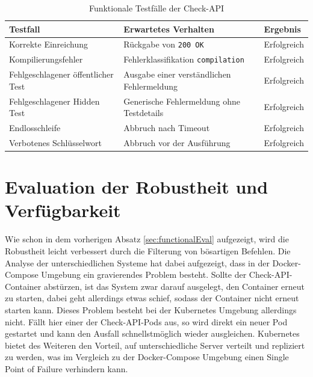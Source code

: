   \begin{table}[htbp]
	\centering
	\caption{Funktionale Testfälle der Check-API}
	\label{tab:functional-evaluation}
	\begin{tabular}{p{4cm} p{5cm} p{4cm}}
		\textbf{Testfall} & \textbf{Erwartetes Verhalten} & \textbf{Ergebnis} \\
		\hline
		Korrekte Einreichung & Rückgabe von \texttt{200 OK} & Erfolgreich \\
		Kompilierungsfehler & Fehlerklassifikation \texttt{compilation} & Erfolgreich \\
		Fehlgeschlagener öffentlicher Test & Ausgabe einer verständlichen Fehlermeldung & Erfolgreich \\
		Fehlgeschlagener Hidden Test & Generische Fehlermeldung ohne Testdetails & Erfolgreich \\
		Endlosschleife & Abbruch nach Timeout & Erfolgreich \\
		Verbotenes Schlüsselwort & Abbruch vor der Ausführung & Erfolgreich \\
	\end{tabular}
\end{table}


\section{Evaluation der Robustheit und Verfügbarkeit}
\label{sec:evalRobustheit}
Wie schon in dem vorherigen Absatz \ref{sec:functionalEval} aufgezeigt, wird die Robustheit leicht verbessert durch die Filterung von bösartigen Befehlen. Die Analyse der unterschiedlichen Systeme hat dabei aufgezeigt, dass in der Docker-Compose Umgebung ein gravierendes Problem besteht. Sollte der Check-API-Container abstürzen, ist das System zwar darauf ausgelegt, den Container erneut zu starten, dabei geht allerdings etwas schief, sodass der Container nicht erneut starten kann. Dieses Problem besteht bei der Kubernetes Umgebung allerdings nicht. Fällt hier einer der Check-API-Pods aus, so wird direkt ein neuer Pod gestartet und kann den Ausfall schnellstmöglich wieder ausgleichen. Kubernetes bietet des Weiteren den Vorteil, auf unterschiedliche Server verteilt und repliziert zu werden, was im Vergleich zu der Docker-Compose Umgebung einen Single Point of Failure verhindern kann.

